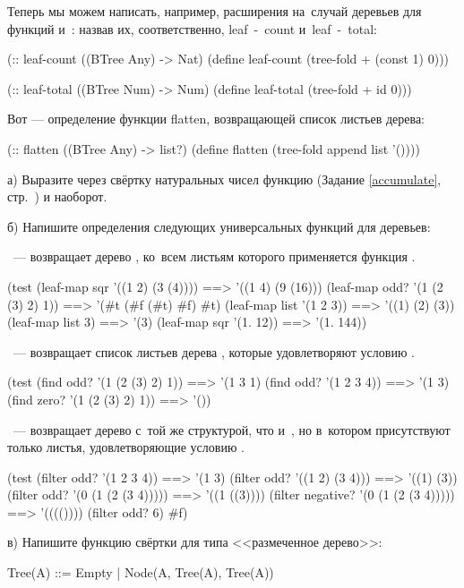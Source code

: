 Теперь мы можем написать, например, расширения на~случай деревьев для функций  и~: назвав их, соответственно, \si{leaf-count} и~\si{leaf-total}:

\begin{SchemeCode}
(:: leaf-count ((BTree Any) -> Nat)
 (define leaf-count 
   (tree-fold + (const 1) 0)))

(:: leaf-total ((BTree Num) -> Num)
 (define leaf-total 
   (tree-fold + id 0)))
\end{SchemeCode}

Вот --- определение функции \si{flatten}, возвращающей список листьев дерева:
\begin{SchemeCode}
(:: flatten ((BTree Any) -> list?)
 (define flatten 
   (tree-fold append list '())))
\end{SchemeCode}

\newpage
\begin{Assignment}
а) Выразите через свёртку натуральных чисел  функцию  (Задание \ref{accumulate}, стр.~\pageref{accumulate}) и наоборот.

б) Напишите определения следующих универсальных функций для деревьев:

 ~--- возвращает дерево , ко~всем листьям которого применяется функция .
\begin{Specification}
(test 
  (leaf-map sqr '((1 2) (3 (4))))  ==> '((1 4) (9 (16)))
  (leaf-map odd? '(1 (2 (3) 2) 1)) ==> '(#t (#f (#t) #f) #t)
  (leaf-map list '(1 2 3))         ==> '((1) (2) (3))
  (leaf-map list 3)                ==> '(3)
  (leaf-map sqr '(1. 12))          ==> '(1. 144))
\end{Specification}

 ~--- возвращает список листьев дерева , которые удовлетворяют условию .
\begin{Specification}
(test 
  (find odd? '(1 (2 (3) 2) 1))   ==> '(1 3 1)
  (find odd? '(1 2 3 4))         ==> '(1 3)
  (find zero? '(1 (2 (3) 2) 1))  ==> '())
\end{Specification}

~--- возвращает дерево с~той же структурой, что и~, но в~котором присутствуют только листья, удовлетворяющие условию .
\begin{Specification}
(test 
  (filter odd? '(1 2 3 4))              ==> '(1 3)
  (filter odd? '((1 2) (3 4)))          ==> '((1) (3))
  (filter odd? '(0 (1 (2 (3 4)))))      ==> '((1 ((3))))
  (filter negative? '(0 (1 (2 (3 4))))) ==> '(((())))
  (filter odd? 6)  #f)
\end{Specification}

в) Напишите функцию свёртки для типа <<размеченное дерево>>:
\begin{SchemeCode}
    Tree(A) ::= Empty
             |  Node(A, Tree(A), Tree(A))
\end{SchemeCode}
\end{Assignment}


